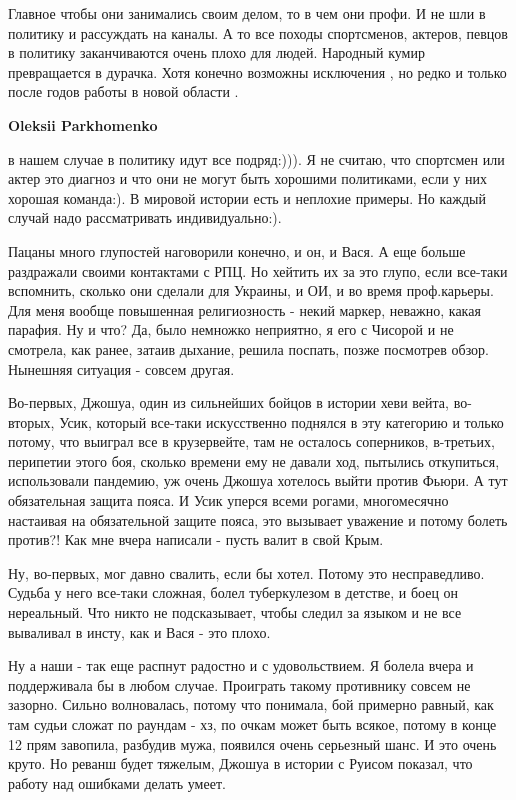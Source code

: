 \begin{itemize}
\begin{itemize}

Главное чтобы они занимались своим делом, то в чем они профи. И не шли в
политику и рассуждать на каналы. А то все походы спортсменов, актеров, певцов в
политику заканчиваются очень плохо для людей. Народный кумир превращается в
дурачка. Хотя конечно возможны исключения , но редко и только после годов
работы в новой области .

\textbf{Oleksii Parkhomenko} 

в нашем случае в политику идут все подряд:))). Я не считаю, что спортсмен или
актер это диагноз и что они не могут быть хорошими политиками, если у них
хорошая команда:). В мировой истории есть и неплохие примеры. Но каждый случай
надо рассматривать индивидуально:).

\end{itemize} %


Пацаны много глупостей наговорили конечно, и он, и Вася. А еще больше
раздражали своими контактами с РПЦ. Но хейтить их за это глупо, если все-таки
вспомнить, сколько они сделали для Украины, и ОИ, и во время проф.карьеры. Для
меня вообще повышенная религиозность - некий маркер, неважно, какая парафия. Ну
и что? Да, было немножко неприятно, я его с Чисорой и не смотрела, как ранее,
затаив дыхание, решила поспать, позже посмотрев обзор. Нынешняя ситуация -
совсем другая. 

Во-первых, Джошуа, один из сильнейших бойцов в истории хеви вейта, во-вторых,
Усик, который все-таки искусственно поднялся в эту категорию и только потому,
что выиграл все в крузервейте, там не осталось соперников, в-третьих, перипетии
этого боя, сколько времени ему не давали ход, пытылись откупиться, использовали
пандемию, уж очень Джошуа хотелось выйти против Фьюри.  А тут обязательная
защита пояса. И Усик уперся всеми рогами, многомесячно настаивая на
обязательной защите пояса, это вызывает уважение и потому болеть против?! Как
мне вчера написали - пусть валит в свой Крым. 

Ну, во-первых, мог давно свалить, если бы хотел. Потому это несправедливо.
Судьба у него все-таки сложная, болел туберкулезом в детстве, и боец он
нереальный. Что никто не подсказывает, чтобы следил за языком и не все
вываливал в инсту, как и Вася - это плохо. 

Ну а наши - так еще распнут радостно и с удовольствием. Я болела вчера и
поддерживала бы в любом случае. Проиграть такому противнику совсем не зазорно.
Сильно волновалась, потому что понимала, бой примерно равный, как там судьи
сложат по раундам - хз, по очкам может быть всякое, потому в конце 12 прям
завопила, разбудив мужа, появился очень серьезный шанс. И это очень круто.  Но
реванш будет тяжелым, Джошуа в истории с Руисом показал, что работу над
ошибками делать умеет.


\end{itemize}
